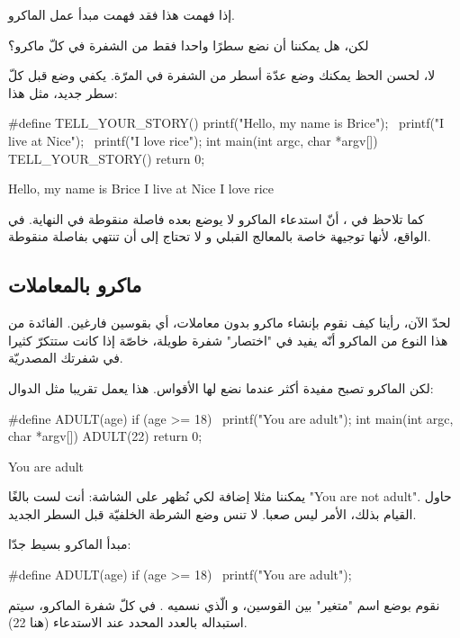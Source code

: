 إذا فهمت هذا فقد فهمت مبدأ عمل الماكرو.

\begin{question}
  لكن، هل يمكننا أن نضع سطرًا واحدا فقط من الشفرة في كلّ ماكرو؟
\end{question}

لا، لحسن الحظ يمكنك وضع عدّة أسطر من الشفرة في المرّة. يكفي وضع
\InlineCode{\textbackslash}
قبل كلّ سطر جديد، مثل هذا:

\begin{Csource}
#define TELL_YOUR_STORY() printf("Hello, my name is Brice\n"); \
                          printf("I live at Nice\n"); \
                          printf("I love rice\n");
int main(int argc, char *argv[])
{
	TELL_YOUR_STORY()
	return 0;
}
\end{Csource}

\begin{Console}
Hello, my name is Brice
I live at Nice
I love rice
\end{Console}

كما تلاحظ في
،
أنّ استدعاء الماكرو لا يوضع بعده فاصلة منقوطة في النهاية. في الواقع، لأنها توجيهة خاصة بالمعالج القبلي و لا تحتاج إلى  أن تنتهي بفاصلة منقوطة.

\subsection{ماكرو بالمعاملات}
لحدّ الآن، رأينا كيف نقوم بإنشاء ماكرو بدون معاملات، أي بقوسين فارغين. الفائدة من هذا النوع من الماكرو أنّه يفيد في "اختصار" شفرة طويلة، خاصّة إذا كانت ستتكرّ كثيرا في شفرتك المصدريّة.

لكن الماكرو تصبح مفيدة أكثر عندما نضع لها الأقواس. هذا يعمل تقريبا مثل الدوال:
\begin{Csource}
#define ADULT(age) if (age >= 18) \
                    printf("You are adult\n");
int main(int argc, char *argv[])
{
	ADULT(22)
	return 0;
}
\end{Csource}

\begin{Console}
You are adult
\end{Console}

\begin{information}
يمكننا مثلا إضافة 
لكي نُظهر على الشاشة: أنت لست بالغًا
"\textenglish{You are not adult}".
حاول القيام بذلك، الأمر ليس صعبا. لا تنس وضع الشرطة الخلفيّة
\InlineCode{\textbackslash}
قبل السطر الجديد.
\end{information}
مبدأ الماكرو بسيط جدّا:
\begin{Csource}
#define ADULT(age) if (age >= 18) \
                    printf("You are adult\n");
\end{Csource}
نقوم بوضع اسم "متغير" بين القوسين، و الّذي نسميه
.
في كلّ شفرة الماكرو،
\InlineCode{age}
سيتم استبداله بالعدد المحدد عند الاستدعاء (هنا 22).

